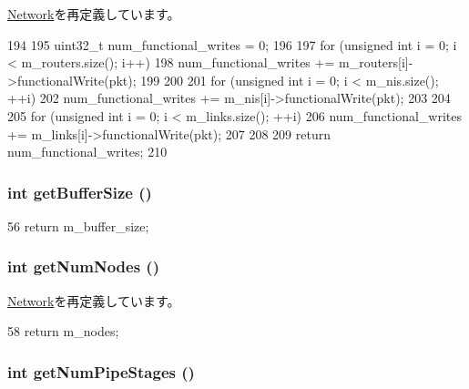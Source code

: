 \hyperlink{classNetwork_a31a4b7e2a90a59a684d84d1284683986}{Network}を再定義しています。


\begin{DoxyCode}
194 {
195     uint32_t num_functional_writes = 0;
196 
197     for (unsigned int i = 0; i < m_routers.size(); i++) {
198         num_functional_writes += m_routers[i]->functionalWrite(pkt);
199     }
200 
201     for (unsigned int i = 0; i < m_nis.size(); ++i) {
202         num_functional_writes += m_nis[i]->functionalWrite(pkt);
203     }
204 
205     for (unsigned int i = 0; i < m_links.size(); ++i) {
206         num_functional_writes += m_links[i]->functionalWrite(pkt);
207     }
208 
209     return num_functional_writes;
210 }
\end{DoxyCode}
\hypertarget{classGarnetNetwork_adaa0495495ece419f5911bc378971502}{
\subsubsection[{getBufferSize}]{\setlength{\rightskip}{0pt plus 5cm}int getBufferSize ()}}
\label{classGarnetNetwork_adaa0495495ece419f5911bc378971502}



\begin{DoxyCode}
56 { return m_buffer_size; }
\end{DoxyCode}
\hypertarget{classGarnetNetwork_a52ab76ba6f0a40a06c6fc4043351824e}{
\subsubsection[{getNumNodes}]{\setlength{\rightskip}{0pt plus 5cm}int getNumNodes ()}}
\label{classGarnetNetwork_a52ab76ba6f0a40a06c6fc4043351824e}


\hyperlink{classNetwork_a7624554588ea569f360d6ea8e1cad409}{Network}を再定義しています。


\begin{DoxyCode}
58 { return m_nodes; }
\end{DoxyCode}
\hypertarget{classGarnetNetwork_a85c15b418bb9035ede7df102e4bc9cea}{
\subsubsection[{getNumPipeStages}]{\setlength{\rightskip}{0pt plus 5cm}int getNumPipeStages ()}}
\label{classGarnetNetwork_a85c15b418bb9035ede7df102e4bc9cea}



